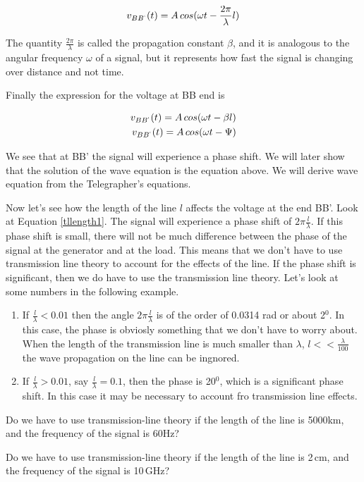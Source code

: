 \documentclass{ximera}
\begin{document}
\begin{eqnarray}
v_{BB^`}(t)=A \, cos(\omega t -  \frac{ 2 \pi }{\lambda} l) \label{tllength1}
\end{eqnarray}

The quantity $ \frac{ 2 \pi }{\lambda} $ is called the propagation constant $\beta$, and it is analogous to the angular frequency $\omega$ of a signal, but it represents how fast  the signal is changing over distance and not time.


Finally the expression for the voltage at BB end is


\begin{eqnarray}
v_{BB^`}(t)=A \, cos(\omega t - \beta l) \\
v_{BB^`}(t)=A \, cos(\omega t - \Psi)
\end{eqnarray}

We see that at BB' the signal will experience a phase shift.
We will later show that the solution of the wave equation is the equation above. We will derive wave equation   from the Telegrapher's
equations.

Now let's see how the length of the line $l$ affects the voltage at the
end BB'. Look at Equation \ref{tllength1}.
The signal will experience a phase shift of $2\pi \frac{l}{\lambda}$. If this phase shift is small, there will not be much difference between
the phase of the signal at the generator and at the load. This means that we don't have to use transmission line theory to account for the effects of the line.
If the phase shift is significant, then we do have to use the transmission line theory. Let's look at some numbers in the  following example.

\begin{enumerate}
\item If $\frac{l}{\lambda} < 0.01$ then the angle $2 \pi
\frac{l}{\lambda}$ is of the order of 0.0314 rad or about 2$^0$. In this case, the
phase is obviosly something that we don't have to worry about. When
the length of the transmission line is much smaller than $\lambda$, $l<<\frac{\lambda}{100}$
the wave propagation on the line can be ingnored.
\item If  $\frac{l}{\lambda} > 0.01$, say  $\frac{l}{\lambda} =0.1$,
then the phase is 20$^0$, which is a significant phase shift. In this
case it may be necessary to account fro transmission line effects.
\end{enumerate}


\begin{question}  
Do we have to use transmission-line theory if the length of the line is 5000km, and the frequency of the signal is 60Hz? 
\begin{multipleChoice}  
\end{multipleChoice}  
\end{question} 



\begin{question}  
Do we have to use transmission-line theory if the length of the line is 2\,cm, and the frequency of the signal is 10\,GHz? 
\begin{multipleChoice}  
\end{multipleChoice}  
\end{question} 
\end{document}
